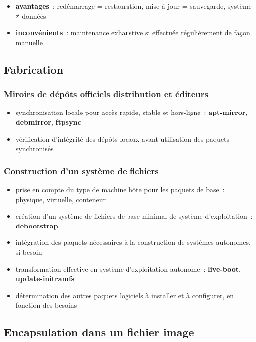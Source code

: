 \documentclass[10pt]{article}
\newenvironment{itmz}{\begin{itemize}
\setlength{\itemsep}{0em}
}{\end{itemize}}
\begin{document}
\begin{itmz}
\item{\textbf{avantages} : redémarrage = restauration, mise à jour = sauvegarde, système ≠ données}
\item{\textbf{inconvénients} : maintenance exhaustive si effectuée régulièrement de façon manuelle}
\end{itmz}

\subsection{Fabrication}

\subsubsection{Miroirs de dépôts officiels distribution et éditeurs}

\begin{itmz}
\item{synchronisation locale pour accès rapide, stable et hors-ligne : \textbf{apt-mirror}, \textbf{debmirror}, \textbf{ftpsync}}
\item{vérification d’intégrité des dépôts locaux avant utilisation des paquets synchronisés}
\end{itmz}

\subsubsection{Construction d’un système de fichiers}

\begin{itmz}
\item{prise en compte du type de machine hôte pour les paquets de base : physique, virtuelle, conteneur}
\item{création d’un système de fichiers de base minimal de système d’exploitation : \textbf{debootstrap}}
\item{intégration des paquets nécessaires à la construction de systèmes autonomes, si besoin}
\item{transformation effective en système d’exploitation autonome : \textbf{live-boot}, \textbf{update-initramfs}}
\item{détermination des autres paquets logiciels à installer et à configurer, en fonction des besoins}
\end{itmz}

\subsection{Encapsulation dans un fichier image}
\end{document}
